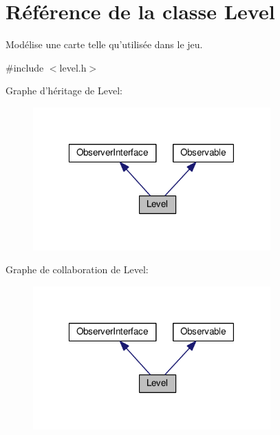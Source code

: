 \hypertarget{classLevel}{\section{Référence de la classe Level}
\label{classLevel}
}


Modélise une carte telle qu'utilisée dans le jeu.  




{\ttfamily \#include $<$level.\+h$>$}



Graphe d'héritage de Level\+:
\nopagebreak
\begin{figure}[H]
\begin{center}
\leavevmode
\includegraphics[width=259pt]{dd/d9f/classLevel__inherit__graph}
\end{center}
\end{figure}


Graphe de collaboration de Level\+:
\nopagebreak
\begin{figure}[H]
\begin{center}
\leavevmode
\includegraphics[width=259pt]{df/dee/classLevel__coll__graph}
\end{center}
\end{figure}
